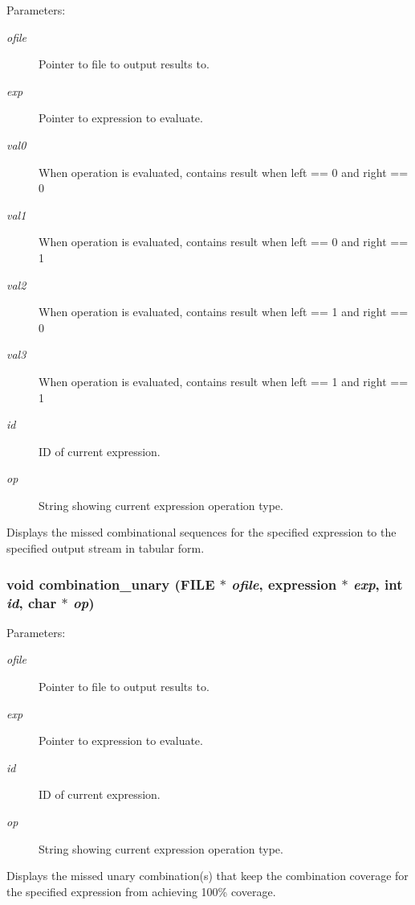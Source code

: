\begin{Desc}
\item[Parameters:]
\begin{description}
\item[{\em ofile}]Pointer to file to output results to. \item[{\em exp}]Pointer to expression to evaluate. \item[{\em val0}]When operation is evaluated, contains result when left == 0 and right == 0 \item[{\em val1}]When operation is evaluated, contains result when left == 0 and right == 1 \item[{\em val2}]When operation is evaluated, contains result when left == 1 and right == 0 \item[{\em val3}]When operation is evaluated, contains result when left == 1 and right == 1 \item[{\em id}]ID of current expression. \item[{\em op}]String showing current expression operation type.\end{description}
\end{Desc}
Displays the missed combinational sequences for the specified expression to the specified output stream in tabular form. 
\subsubsection{\setlength{\rightskip}{0pt plus 5cm}void combination\_\-unary (FILE $\ast$ {\em ofile}, {\bf expression} $\ast$ {\em exp}, int {\em id}, char $\ast$ {\em op})}\label{comb_8c_a13}


\begin{Desc}
\item[Parameters:]
\begin{description}
\item[{\em ofile}]Pointer to file to output results to. \item[{\em exp}]Pointer to expression to evaluate. \item[{\em id}]ID of current expression. \item[{\em op}]String showing current expression operation type.\end{description}
\end{Desc}
Displays the missed unary combination(s) that keep the combination coverage for the specified expression from achieving 100\% coverage. 
